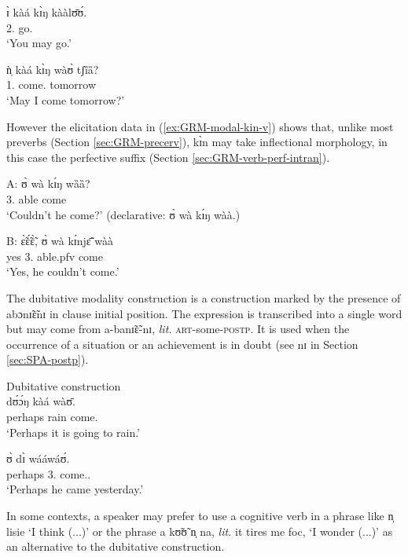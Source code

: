 \ex  
\gll ɪ̀ kàá kɪ̀ŋ kààlʊ̄ʊ́.\\
 {2.\sg} {\fut} {\abi} go.{\foc}\\
\glt  `You may go.'

\ex\label{ex:GRM-modal-13.1}
\gll ǹ̩ kàá kɪ̀ŋ wàʊ̀ tʃȉȁ?\\
 {1.\sg}  {\fut} {\abi} come.{\foc} tomorrow\\
\glt `May I come tomorrow?'

\z
\z

However  the elicitation data in (\ref{ex:GRM-modal-kin-v}) shows that, unlike most preverbs  (Section \ref{sec:GRM-precerv}), {\sls kɪ̀n}   may take inflectional morphology, in this case the perfective suffix (Section \ref{sec:GRM-verb-perf-intran}).  

\ea\label{ex:GRM-modal-kin-v}
\ea 
\gll A: ʊ̀ wà kɪ́ŋ wȁȁ?\\
{} {3.\sg} {\neg} {able} come \\
\glt  `Couldn't he come?' (declarative: {\sls ʊ̀ wà kɪ́ŋ wàà.})

\ex 
\gll  B: ɛ̃̀ɛ̃́ɛ̃̀, ʊ̀ wà kɪ́njɛ̃̄ wàà\\
{}  yes {3.\sg} {\neg} able.{\sc pfv} come\\
\glt  `Yes, he couldn't come.'

\z
\z

The dubitative modality construction is a construction marked by the presence of  
{\sls abɔnɪ̃ɛ̃nɪ} in clause initial position.  The expression is transcribed into  a single word but may come from {\sls a-banɪ̃ɛ̃-nɪ}, {\it lit.} \textsc{art}-some-\textsc{postp}. It  is used when the occurrence of a 
situation  or an achievement  is in doubt (see {\sls nɪ} in Section \ref{sec:SPA-postp}).

\ea
\label{ex:GRM-modal}{\rm Dubitative construction}\\

\ea
\label{ex:GRM-modal-45.5}
  dʊ́ɔ́ŋ kàá wàʊ̄.\\
perhaps rain {\fut} come.{\foc}\\
\glt  `Perhaps it is going to rain.'


\ex
\label{ex:GRM-modal-45.3}
   ʊ̀ dɪ̀ wááwáʊ́.\\
perhaps  {3.\sg} {\hest} come.{\pfv.\foc}\\
\glt `Perhaps he came yesterday.'

\z
\z


In some contexts, a speaker may prefer  to use a cognitive verb in a phrase like {\sls n̩ lisie} `I think (...)'  or the phrase {\sls a kʊ̃ʊ̃ n̩ na}, {\it lit.} it tires me {\sc foc},  `I wonder (...)' as an alternative to the dubitative construction. 

